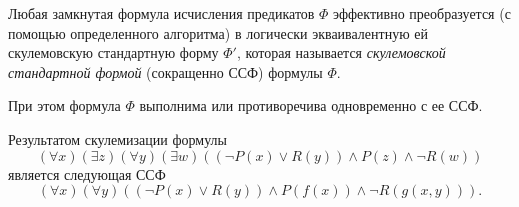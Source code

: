 \begin{theorem}
    Любая замкнутая формула исчисления предикатов $\Phi$ эффективно преобразуется (с помощью определенного алгоритма) в логически экваивалентную ей скулемовскую стандартную форму $\Phi'$, которая называется \textit{скулемовской стандартной формой} (сокращенно ССФ) формулы $\Phi$.

    При этом формула $\Phi$ выполнима или противоречива одновременно с ее ССФ.
\end{theorem}

\begin{example}
    Результатом скулемизации формулы
    $$(\forall x)(\exists z)(\forall y)(\exists w)((\lnot P(x)\lor R(y))\land P(z)\land \lnot R(w))$$ является следующая ССФ
    $$(\forall x)(\forall y)((\lnot P(x)\lor R(y))\land P(f(x))\land\lnot R(g(x,y))).$$
\end{example}